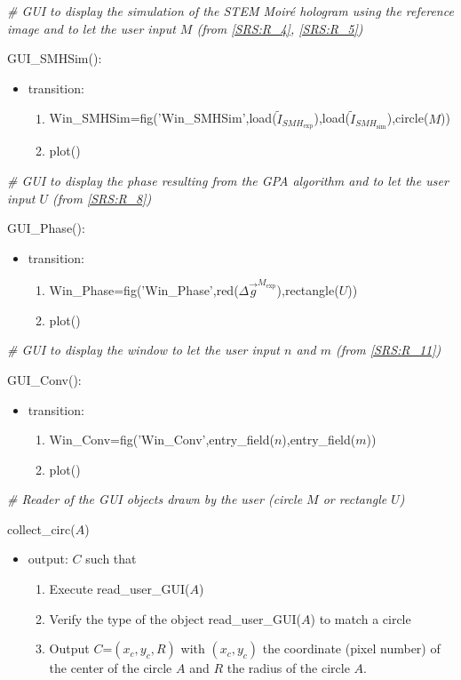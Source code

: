 \documentclass[12pt, titlepage]{article}
\begin{document}
\noindent\textit{{\#} GUI to display the simulation of the STEM Moir{\'e} hologram using the reference image and to let the user input $M$ (from \cref{SRS:R_4}, \cref{SRS:R_5})}\medskip

\noindent GUI{\_}SMHSim():
\begin{itemize}
\item transition: 
	\begin{enumerate}
	\item Win{\_}SMHSim=fig('Win{\_}SMHSim',load($\widetilde{I}_{\mathit{SMH}_{\text{exp}}}$),load($\widetilde{I}_{\mathit{SMH}_{\text{sim}}}$),circle($M$))
	\item plot()
	\end{enumerate} 
\end{itemize}
\bigskip

\noindent\textit{{\#} GUI to display the phase resulting from the GPA algorithm and to let the user input $U$ (from \cref{SRS:R_8})}\medskip

\noindent GUI{\_}Phase():
\begin{itemize}
\item transition: 
	\begin{enumerate}
	\item Win{\_}Phase=fig('Win{\_}Phase',red($\Delta \overrightarrow{g}^{M_{\text{exp}}}$),rectangle($U$))
	\item plot()
	\end{enumerate} 
\end{itemize}
\bigskip

\noindent\textit{{\#} GUI to display the window to let the user input $n$ and $m$ (from \cref{SRS:R_11})}\medskip

\noindent GUI{\_}Conv():
\begin{itemize}
\item transition: 
	\begin{enumerate}
	\item Win{\_}Conv=fig('Win{\_}Conv',entry{\_}field($n$),entry{\_}field($m$))
	\item plot()
	\end{enumerate} 
\end{itemize}
\bigskip

\noindent\textit{{\#} Reader of the GUI objects drawn by the user (circle $M$ or rectangle $U$)} \medskip

\noindent collect{\_}circ($A$)
\begin{itemize}
\item output: $C$ such that
	\begin{enumerate}
	\item Execute read{\_}user{\_}GUI($A$)
	\item Verify the type of the object read{\_}user{\_}GUI($A$) to match a circle
	\item Output $C$=$(x_c,y_c,R)$ with $(x_c,y_c)$ the coordinate (pixel number) of the center of the circle $A$ and $R$ the radius of the circle $A$.
	\end{enumerate} 
\end{itemize}
\bigskip
\end{document}
